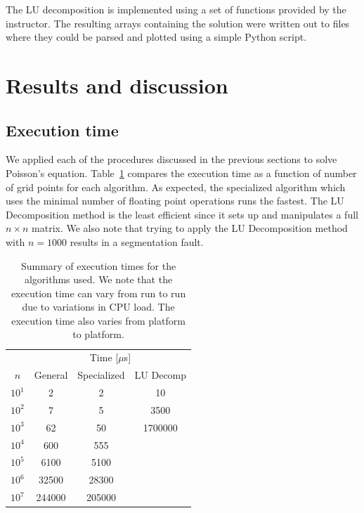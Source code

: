 \documentclass[10pt,showpacs,preprintnumbers,footinbib,amsmath,amssymb,aps,prl,twocolumn,groupedaddress,superscriptaddress,showkeys]{revtex4-1}
\begin{document}
 

The LU decomposition is implemented using a set of functions
provided by the instructor. The resulting arrays containing
the solution were written out to files where they could be
parsed and plotted using a simple Python script.


\section{Results and discussion}

\subsection{Execution time}

We applied each of the procedures discussed in the previous sections to solve
Poisson's equation. Table~\ref{tab:speedresults} compares the execution time
as a function of number of grid points for each algorithm. As expected, the
specialized algorithm which uses the minimal number of floating point
operations runs the fastest. The LU Decomposition method is the least efficient
since it sets up and manipulates a full $n \times n$ matrix. We also note
that trying to apply the LU Decomposition method with $n=1000$ results in a
segmentation fault.

\begin{table}
\centering
	\begin{tabular}{ c | c c c }
	 & \multicolumn{3}{c}{Time [$\mu$s]}\\
	$n$ & General & Specialized & LU Decomp\\
\hline
	$10^{1}$ & 2       & 2       & 10 \\
	$10^{2}$ & 7       & 5       & 3500 \\
	$10^{3}$ & 62      & 50      & 1700000\\
	$10^{4}$ & 600     & 555     & \\
	$10^{5}$ & 6100    & 5100    & \\
	$10^{6}$ & 32500   & 28300   & \\
	$10^{7}$ & 244000  & 205000  & \\
\hline
	\end{tabular}
	\caption{Summary of execution times for the algorithms used.
	We note that the execution time can vary from run to run due
	to variations in CPU load. The execution time also varies
	from platform to platform.}
	\label{tab:speedresults}
\end{table}
\end{document}
